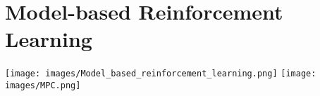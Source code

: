 \section{Model-based Reinforcement Learning}

\texttt{[image: images/Model\_based\_reinforcement\_learning.png]}
\texttt{[image: images/MPC.png]}
